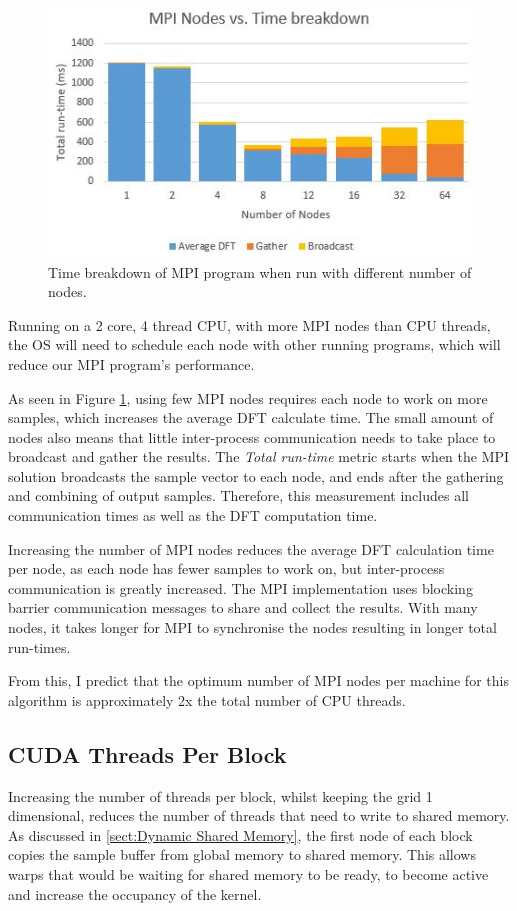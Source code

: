 \documentclass[11pt,a4paper]{article}
\begin{document}
\begin{figure}
\begin{center}
\includegraphics[scale=0.7]{mpi_eval_nodes}
\end{center}
\caption{Time breakdown of MPI program when run with different number of nodes.}
\label{fig:mpi_eval_nodes}
\end{figure}

Running on a 2 core, 4 thread CPU, with more MPI nodes than CPU threads, the OS will need to schedule each node with other running programs, which will reduce our MPI program's performance.

As seen in Figure \ref{fig:mpi_eval_nodes}, using few MPI nodes requires each node to work on more samples, which increases the average DFT calculate time. The small amount of nodes also means that little inter-process communication needs to take place to broadcast and gather the results. The \textit{Total run-time} metric starts when the MPI solution broadcasts the sample vector to each node, and ends after the gathering and combining of output samples. Therefore, this measurement includes all communication times as well as the DFT computation time.

Increasing the number of MPI nodes reduces the average DFT calculation time per node, as each node has fewer samples to work on, but inter-process communication is greatly increased. The MPI implementation uses blocking barrier communication messages to share and collect the results. With many nodes, it takes longer for MPI to synchronise the nodes resulting in longer total run-times.

From this, I predict that the optimum number of MPI nodes per machine for this algorithm is approximately 2x the total number of CPU threads.

\subsection{CUDA Threads Per Block}
Increasing the number of threads per block, whilst keeping the grid 1 dimensional, reduces the number of threads that need to write to shared memory. As discussed in \ref{sect:Dynamic Shared Memory}, the first node of each block copies the sample buffer from global memory to shared memory. This allows warps that would be waiting for shared memory to be ready, to become active and increase the occupancy of the kernel.
\end{document}
